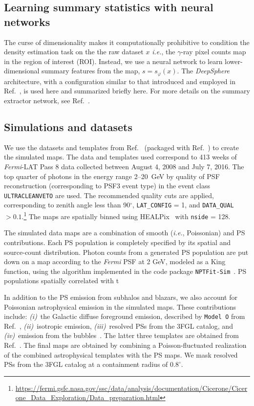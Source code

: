 \documentclass[prd,aps,10pt,nofootinbib,twocolumn,superscriptaddress,preprintnumbers,balancelastpage,longbibliography]{revtex4-1}
\begin{document}
\subsection{Learning summary statistics with neural networks}

The curse of dimensionality makes it computationally prohibitive to condition the density estimation task on the the raw dataset $x$ \emph{i.e.}, the $\gamma$-ray pixel counts map in the region of interest (ROI). Instead, we use a neural network to learn lower-dimensional summary features from the map, $s = s_\varphi(x)$. The \emph{DeepSphere}~\cite{defferrard2020deepsphere,Perraudin:2018rbt} architecture, with a configuration similar to that introduced and employed in Ref.~\cite{List:2020mzd}, is used here and summarized briefly here. For more details on the summary extractor network, see Ref.~\cite{List:2020mzd}.

\subsection{Simulations and datasets}

We use the datasets and templates from Ref.~\cite{rodd_nicholas_safdi_siddharth_2016} (packaged with Ref.~\cite{Mishra-Sharma:2016gis}) to create the simulated maps. The data and templates used correspond to 413 weeks of \emph{Fermi}-LAT Pass 8 data collected between August 4, 2008 and July 7, 2016. The top quarter of photons in the energy range 2--20~GeV by quality of PSF reconstruction (corresponding to PSF3 event type) in the event class \texttt{ULTRACLEANVETO} are used. The recommended quality cuts are applied, corresponding to zenith angle less than 90$^\circ$, \texttt{LAT\_CONFIG} = 1, and \texttt{DATA\_QUAL} $> 0.1$.\footnote{\url{https://fermi.gsfc.nasa.gov/ssc/data/analysis/documentation/Cicerone/Cicerone_Data_Exploration/Data_preparation.html}} The maps are spatially binned using HEALPix~\cite{Gorski:2004by} with \texttt{nside} = 128.

The simulated data maps are a combination of smooth (\emph{i.e.}, Poissonian) and PS contributions. Each PS population is completely specified by its spatial and source-count distribution. Photon counts from a generated PS population are put down on a map according to the \emph{Fermi} PSF at 2 GeV, modeled as a King function, using the algorithm implemented in the code package \texttt{NPTFit-Sim}~\cite{NPTFit-Sim}. PS populations spatially correlated with t

In addition to the PS emission from subhalos and blazars, we also account for Poissonian astrophysical emission in the simulated maps.  These contributions include: \emph{(i)}~the Galactic diffuse foreground emission, described by \texttt{Model~O} from Ref.~\cite{Buschmann:2020adf}, \emph{(ii)}~isotropic emission, \emph{(iii)}~resolved PSs from the 3FGL catalog, and \emph{(iv)}~emission from the \Fermi bubbles~\cite{Su:2010qj}. The latter three templates are obtained from Ref.~\cite{rodd_nicholas_safdi_siddharth_2016}. The final maps are obtained by combining a Poisson-fluctuated realization of the combined astrophysical templates with the PS maps. We mask resolved PSs from the 3FGL catalog at a containment radius of $0.8^\circ$.   
\end{document}
